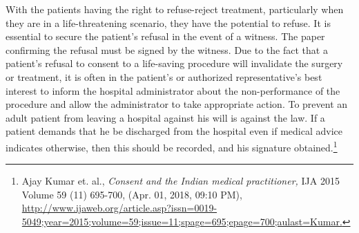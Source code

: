 \begin{multicols}{2}
\noi
With the patients having the right to refuse-reject treatment, particularly when they are in a
life-threatening scenario, they have the potential to refuse. It is essential to secure the
patient's refusal in the event of a witness. The paper confirming the refusal must be signed by
the witness. Due to the fact that a patient's refusal to consent to a life-saving procedure will
invalidate the surgery or treatment, it is often in the patient's or authorized representative's
best interest to inform the hospital administrator about the non-performance of the procedure
and allow the administrator to take appropriate action. To prevent an adult patient from
leaving a hospital against his will is against the law. If a patient demands that he be
discharged from the hospital even if medical advice indicates otherwise, then this should be
recorded, and his signature obtained.\footnote{Ajay Kumar et. al., \textit{Consent and the Indian medical practitioner,} IJA 2015 Volume 59 (11) 695-700, (Apr. 01, 2018, 09:10 PM), \url{http://www.ijaweb.org/article.asp?issn=0019- 5049;year=2015;volume=59;issue=11;spage=695;epage=700;aulast=Kumar.}}


\end{multicols}
